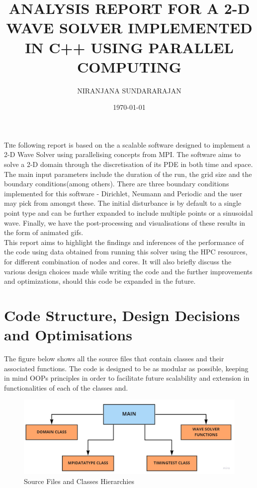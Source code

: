 \documentclass[twoside,twocolumn]{article}
\title{ANALYSIS REPORT FOR A 2-D WAVE SOLVER IMPLEMENTED IN C++ USING PARALLEL COMPUTING} %
\author{%
\textsc{NIRANJANA SUNDARARAJAN}
}
\date{\today} %
\begin{document}
\maketitle

\lettrine[nindent=1em,lines=2]{T}he following report is based on the a scalable software designed to implement a 2-D Wave Solver using parallelising concepts from MPI. The software aims to solve a 2-D domain through the discretisation of its PDE in both time and space. The main input parameters include the duration of the run, the grid size and the boundary conditions(among others). There are three boundary conditions implemented for this software - Dirichlet, Neumann and Periodic and the user may pick from amongst these. The initial disturbance is by default to a single point type and can be further expanded to include multiple points or a sinusoidal wave. Finally, we have the post-processing and visualisations of these results in the form of animated gifs.\\
This report aims to highlight the findings and inferences of the performance of the code using data obtained from running this solver using the HPC resources, for different combination of nodes and cores. It will also briefly discuss the various design choices made while writing the code and the further improvements and optimizations, should this code be expanded in the future.

\section{Code Structure, Design Decisions and Optimisations}
The figure below shows all the source files that contain classes and their associated functions. The code is designed to be as modular as possible, keeping in mind OOPs principles in order to facilitate future scalability and extension in functionalities of each of the classes and.
\vspace{-4mm}
\begin{figure}[h]
\centering
\includegraphics[height=3.5 cm\textwidth]{images/FileStructure.jpg}
\caption{Source Files and Classes Hierarchies}
\end{figure}
\end{document}

